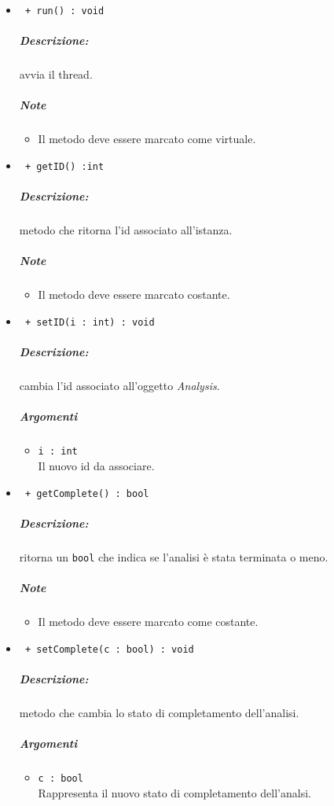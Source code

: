 \begin{itemize}
	\item \color{blue}\verb! + run() : void!\\
	\color{black}\subparagraph{Descrizione:} avvia il thread.
	\subparagraph{Note}
		\begin{itemize}
			\item Il metodo deve essere marcato come virtuale.
		\end{itemize}
	
	\item \color{blue}\verb! + getID() :int!\\
	\color{black}\subparagraph{Descrizione:} metodo che ritorna l'id associato all'istanza.
	\subparagraph{Note}
		\begin{itemize}
			\item Il metodo deve essere marcato costante.
		\end{itemize}
		
	\item \color{blue}\verb! + setID(i : int) : void!\\
	\color{black}\subparagraph{Descrizione:} cambia l'id associato all'oggetto \textsl{Analysis}.
	\subparagraph{Argomenti}
		\begin{itemize}
			\item \color{RoyalPurple}\verb!i : int!\\
			\color{black}Il nuovo id da associare.
		\end{itemize}
		
	\item \color{blue}\verb! + getComplete() : bool!\\
	\color{black}\subparagraph{Descrizione:} ritorna un \verb!bool! che indica se l'analisi è stata terminata o meno.
	\subparagraph{Note}
		\begin{itemize}
			\item Il metodo deve essere marcato come costante.
		\end{itemize}
		
	\item \color{blue}\verb! + setComplete(c : bool) : void!\\
	\color{black}\subparagraph{Descrizione:} metodo che cambia lo stato di completamento dell'analisi.
	\subparagraph{Argomenti}
		\begin{itemize}
			\item \color{RoyalPurple}\verb!c : bool!\\
			Rappresenta il nuovo stato di completamento dell'analsi.
		\end{itemize}
		

\end{itemize}
